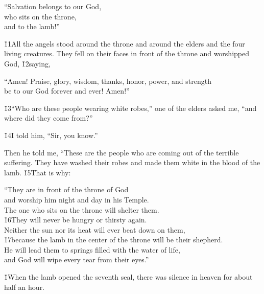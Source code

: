 \begin{poetry}
\poeml ``Salvation belongs to our God, \\
\poemll    who sits on the throne, \\
\poemlll       and to the lamb!''
\end{poetry}

\v{11}All the angels stood around the throne and around the elders and the four living creatures. They fell on their faces in front of the throne and worshipped God, \v{12}saying,

\begin{poetry}
\poeml ``Amen! Praise, glory, wisdom, thanks, honor, power, and strength \\
\poemll    be to our God forever and ever! Amen!''
\end{poetry}

\v{13}``Who are these people wearing white robes,'' one of the elders asked me, ``and where did they come from?''

\v{14}I told him, ``Sir, you know.''

Then he told me, ``These are the people who are coming out of the terrible suffering. They have washed their robes and made them white in the blood of the lamb. \v{15}That is why:

\begin{poetry}
\poeml ``They are in front of the throne of God \\
\poemll    and worship him night and day in his Temple. \\
\poeml The one who sits on the throne will shelter them. \\
\poeml \v{16}They will never be hungry or thirsty again. \\
\poemll    Neither the sun nor its heat will ever beat down on them, \\
\poeml \v{17}because the lamb in the center of the throne will be their shepherd. \\
\poemll    He will lead them to springs filled with the water of life, \\
\poemlll       and God will wipe every tear from their eyes.''
\end{poetry}

\v{1}When the lamb opened the seventh seal, there was silence in heaven for about half an hour.


